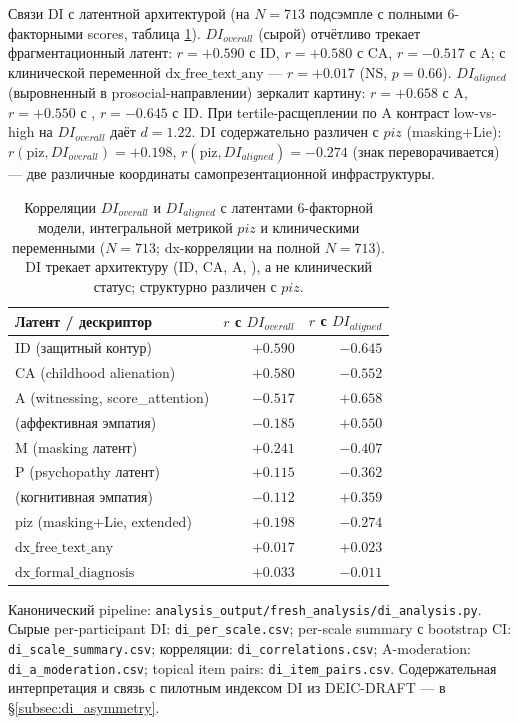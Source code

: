 Связи DI с латентной архитектурой (на $N{=}713$ подсэмпле с полными 6-факторными scores, таблица \ref{tab:di_corr}). $DI_{overall}$ (сырой) отчётливо трекает фрагментационный латент: $r{=}{+}0.590$ с ID, $r{=}{+}0.580$ с CA, $r{=}{-}0.517$ с A; с клинической переменной $\mathrm{dx\_free\_text\_any}$ --- $r{=}{+}0.017$ (NS, $p{=}0.66$). $DI_{aligned}$ (выровненный в prosocial-направлении) зеркалит картину: $r{=}{+}0.658$ с A, $r{=}{+}0.550$ с \EAF{}, $r{=}{-}0.645$ с ID. При tertile-расщеплении по A контраст low-vs-high на $DI_{overall}$ даёт $d{=}1.22$. DI содержательно различен с $piz$ (masking+Lie): $r(\text{piz}, DI_{overall}){=}{+}0.198$, $r(\text{piz}, DI_{aligned}){=}{-}0.274$ (знак переворачивается) --- две различные координаты самопрезентационной инфраструктуры.

\begin{table}[H]
\centering
\begin{tabular}{l r r}
\toprule
Латент / дескриптор & $r$ с $DI_{overall}$ & $r$ с $DI_{aligned}$ \\
\midrule
ID (защитный контур) & $+0.590$ & $-0.645$ \\
CA (childhood alienation) & $+0.580$ & $-0.552$ \\
A (witnessing, score\_attention) & $-0.517$ & $+0.658$ \\
\EAF{} (аффективная эмпатия) & $-0.185$ & $+0.550$ \\
M (masking латент) & $+0.241$ & $-0.407$ \\
P (psychopathy латент) & $+0.115$ & $-0.362$ \\
\Ecog{} (когнитивная эмпатия) & $-0.112$ & $+0.359$ \\
piz (masking+Lie, extended) & $+0.198$ & $-0.274$ \\
$\mathrm{dx\_free\_text\_any}$ & $+0.017$ & $+0.023$ \\
$\mathrm{dx\_formal\_diagnosis}$ & $+0.033$ & $-0.011$ \\
\bottomrule
\end{tabular}
\caption{Корреляции $DI_{overall}$ и $DI_{aligned}$ с латентами 6-факторной модели, интегральной метрикой $piz$ и клиническими переменными ($N{=}713$; dx-корреляции на полной $N{=}713$). DI трекает архитектуру (ID, CA, A, \EAF{}), а не клинический статус; структурно различен с $piz$.}
\label{tab:di_corr}
\end{table}

Канонический pipeline: \texttt{analysis\_output/fresh\_analysis/di\_analysis.py}. Сырые per-participant DI: \texttt{di\_per\_scale.csv}; per-scale summary с bootstrap CI: \texttt{di\_scale\_summary.csv}; корреляции: \texttt{di\_correlations.csv}; A-moderation: \texttt{di\_a\_moderation.csv}; topical item pairs: \texttt{di\_item\_pairs.csv}. Содержательная интерпретация и связь с пилотным индексом DI из DEIC-DRAFT --- в §\ref{subsec:di_asymmetry}.

